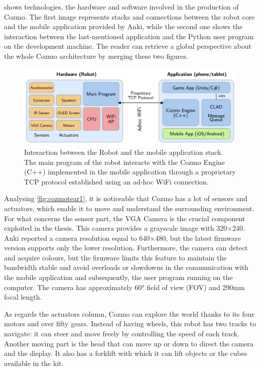 shows technologies, the hardware and software involved in the production of Cozmo.
The first image represents stacks and connections between the robot core and the mobile application provided by Anki, while the second one shows the interaction between the last-mentioned application and the Python user program on the development machine.
The reader can retrieve a global perspective about the whole Cozmo architecture by merging these two figures.

\begin{figure}
	\centering
	\includegraphics[width=\textwidth]{img/cozmo-hw.png}
	\caption[Interaction Robot / Mobile Application]{Interaction between the Robot and the mobile application stack.
The main program of the robot interacts with the Cozmo Engine (C++) implemented in the mobile application through a proprietary TCP protocol established using an ad-hoc WiFi connection.
\cite{mellon2017cognitive}}
	\label{fig:cozmotear1}
\end{figure}

Analysing \vref{fig:cozmotear1}, it is noticeable that Cozmo has a lot of sensors and actuators, which enable it to move and understand the surrounding environment.
For what concerns the sensor part, the VGA Camera is the crucial component exploited in the thesis.
This camera provides a grayscale image with 320$\times$240.
Anki reported a camera resolution equal to 640$\times$480, but the latest firmware version supports only the lower resolution.
Furthermore, the camera can detect and acquire colours, but the firmware limits this feature to maintain the bandwidth stable and avoid overloads or slowdowns in the communication with the mobile application and subsequently, the user program running on the computer.
The camera has approximately 60° field of view (FOV) and 290mm focal length.

As regards the actuators column, Cozmo can explore the world thanks to its four motors and over fifty gears.
Instead of having wheels, this robot has two tracks to navigate: it can steer and move freely by controlling the speed of each track.
Another moving part is the head that can move up or down to direct the camera and the display.
It also has a forklift with which it can lift objects or the cubes available in the kit.

